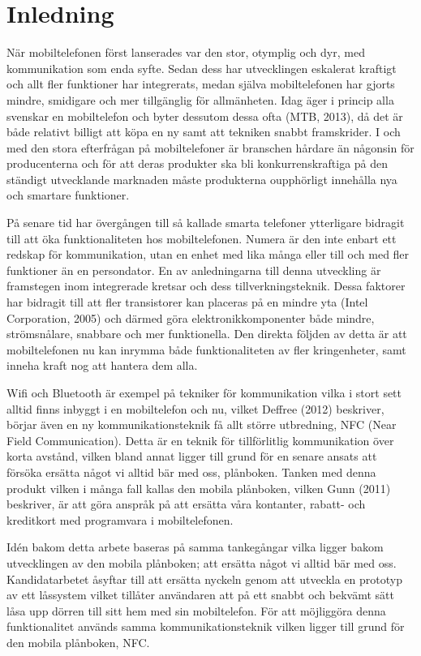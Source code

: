 \documentclass[11pt]{article}
\begin{document}
\setcounter{secnumdepth}{4}
\setcounter{tocdepth}{4}
\tableofcontents
\newpage


\section{Inledning}
\label{Inledning}
När mobiltelefonen först lanserades var den stor, otymplig och dyr, med kommunikation som enda syfte. Sedan dess har utvecklingen eskalerat kraftigt och allt fler funktioner har integrerats, medan själva mobiltelefonen har gjorts mindre, smidigare och mer tillgänglig för allmänheten. Idag äger i princip alla svenskar en mobiltelefon och byter dessutom dessa ofta (MTB, 2013), då det är både relativt billigt att köpa en ny samt att tekniken snabbt framskrider. I och med den stora efterfrågan på mobiltelefoner är branschen hårdare än någonsin för producenterna och för att deras produkter ska bli konkurrenskraftiga på den ständigt utvecklande marknaden måste produkterna oupphörligt innehålla nya och smartare funktioner.

På senare tid har övergången till så kallade smarta telefoner ytterligare bidragit till att öka funktionaliteten hos mobiltelefonen. Numera är den inte enbart ett redskap för kommunikation, utan en enhet med lika många eller till och med fler funktioner än en persondator. En av anledningarna till denna utveckling är framstegen inom integrerade kretsar och dess tillverkningsteknik. Dessa faktorer har bidragit till att fler transistorer kan placeras på en mindre yta (Intel Corporation, 2005) och därmed göra elektronikkomponenter både mindre, strömsnålare, snabbare och mer funktionella. Den direkta följden av detta är att mobiltelefonen nu kan inrymma både funktionaliteten av fler kringenheter, samt inneha kraft nog att hantera dem alla.

Wifi och Bluetooth är exempel på tekniker för kommunikation vilka i stort sett alltid finns inbyggt i en mobiltelefon och nu, vilket Deffree (2012) beskriver, börjar även en ny kommunikationsteknik få allt större utbredning, NFC (Near Field Communication). Detta är en teknik för tillförlitlig kommunikation över korta avstånd, vilken bland annat ligger till grund för en senare ansats att försöka ersätta något vi alltid bär med oss, plånboken. Tanken med denna produkt vilken i många fall kallas den mobila plånboken, vilken Gunn (2011) beskriver, är att göra anspråk på att ersätta våra kontanter, rabatt- och kreditkort med programvara i mobiltelefonen.

Idén bakom detta arbete baseras på samma tankegångar vilka ligger bakom utvecklingen av den mobila plånboken; att ersätta något vi alltid bär med oss. Kandidatarbetet åsyftar till att ersätta nyckeln genom att utveckla en prototyp av ett låssystem vilket tillåter användaren att på ett snabbt och bekvämt sätt låsa upp dörren till sitt hem med sin mobiltelefon. För att möjliggöra denna funktionalitet används samma kommunikationsteknik vilken ligger till grund för den mobila plånboken, NFC.
\end{document}
